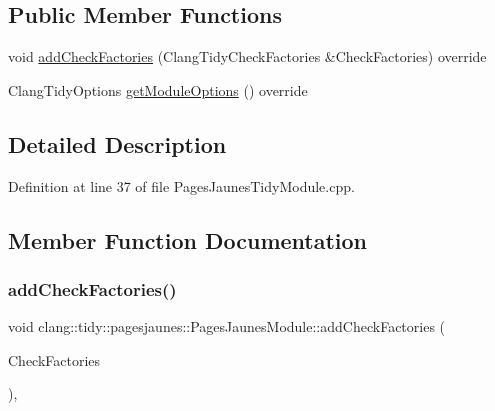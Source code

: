\subsection*{Public Member Functions}
\begin{DoxyCompactItemize}
\item 
void \hyperlink{classclang_1_1tidy_1_1pagesjaunes_1_1_pages_jaunes_module_a3974a18e65a661577cf7109f14466138}{add\+Check\+Factories} (Clang\+Tidy\+Check\+Factories \&Check\+Factories) override
\item 
Clang\+Tidy\+Options \hyperlink{classclang_1_1tidy_1_1pagesjaunes_1_1_pages_jaunes_module_af2eb38da2b6636a14766478530b4aa17}{get\+Module\+Options} () override
\end{DoxyCompactItemize}


\subsection{Detailed Description}


Definition at line 37 of file Pages\+Jaunes\+Tidy\+Module.\+cpp.



\subsection{Member Function Documentation}
\mbox{\label{classclang_1_1tidy_1_1pagesjaunes_1_1_pages_jaunes_module_a3974a18e65a661577cf7109f14466138}} 
\subsubsection{\texorpdfstring{add\+Check\+Factories()}{addCheckFactories()}}
{\footnotesize\ttfamily void clang\+::tidy\+::pagesjaunes\+::\+Pages\+Jaunes\+Module\+::add\+Check\+Factories (\begin{DoxyParamCaption}\item[{Clang\+Tidy\+Check\+Factories \&}]{Check\+Factories }\end{DoxyParamCaption})\hspace{0.3cm}{\ttfamily [inline]}, {\ttfamily [override]}}

